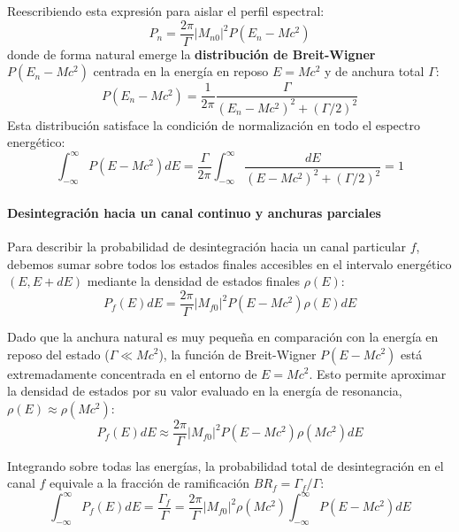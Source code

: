 Reescribiendo esta expresión para aislar el perfil espectral:
\begin{equation}
P_n = \frac{2\pi}{\Gamma} |M_{n0}|^2 P(E_n - M c^2)
\end{equation}
donde de forma natural emerge la \textbf{distribución de Breit-Wigner} $P(E_n - M c^2)$ centrada en la energía en reposo $E = M c^2$ y de anchura total $\Gamma$:
\begin{equation}
P(E_n - M c^2) = \frac{1}{2\pi} \frac{\Gamma}{(E_n - M c^2)^2 + (\Gamma / 2)^2}
\end{equation}
Esta distribución satisface la condición de normalización en todo el espectro energético:
\begin{equation}
\int_{-\infty}^\infty P(E - M c^2) dE = \frac{\Gamma}{2\pi} \int_{-\infty}^\infty \frac{dE}{(E - M c^2)^2 + (\Gamma / 2)^2} = 1
\end{equation}

\paragraph{Desintegración hacia un canal continuo y anchuras parciales}

Para describir la probabilidad de desintegración hacia un canal particular $f$, debemos sumar sobre todos los estados finales accesibles en el intervalo energético $(E, E + dE)$ mediante la densidad de estados finales $\rho(E)$:
\begin{equation}
P_f(E) dE = \frac{2\pi}{\Gamma} |M_{f0}|^2 P(E - M c^2) \rho(E) dE
\end{equation}

Dado que la anchura natural es muy pequeña en comparación con la energía en reposo del estado ($\Gamma \ll M c^2$), la función de Breit-Wigner $P(E - M c^2)$ está extremadamente concentrada en el entorno de $E = M c^2$. Esto permite aproximar la densidad de estados por su valor evaluado en la energía de resonancia, $\rho(E) \approx \rho(M c^2)$:
\begin{equation}
P_f(E) dE \approx \frac{2\pi}{\Gamma} |M_{f0}|^2 P(E - M c^2) \rho(M c^2) dE
\end{equation}

Integrando sobre todas las energías, la probabilidad total de desintegración en el canal $f$ equivale a la fracción de ramificación $BR_f = \Gamma_f / \Gamma$:
\begin{equation}
\int_{-\infty}^\infty P_f(E) dE = \frac{\Gamma_f}{\Gamma} = \frac{2\pi}{\Gamma} |M_{f0}|^2 \rho(M c^2) \int_{-\infty}^\infty P(E - M c^2) dE
\end{equation}


